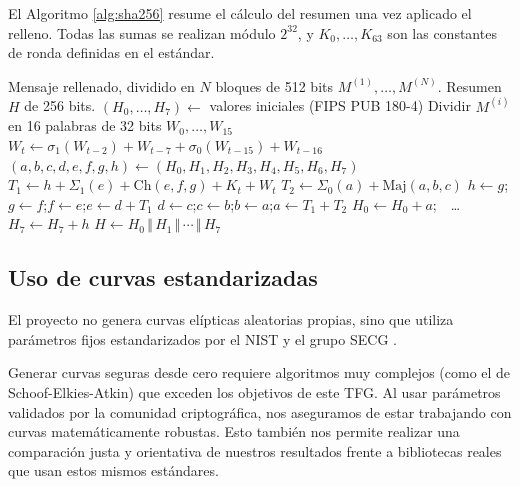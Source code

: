 El Algoritmo \ref{alg:sha256} resume el cálculo del resumen una vez aplicado el relleno. Todas las sumas se realizan módulo \(2^{32}\), y \(K_0,\dots,K_{63}\) son las constantes de ronda definidas en el estándar.

\begin{algorithm}
\caption{Cálculo del resumen SHA-256 (FIPS PUB 180-4)}
\label{alg:sha256}
\begin{algorithmic}[1]
\Require Mensaje rellenado, dividido en \(N\) bloques de 512 bits \(M^{(1)},\dots,M^{(N)}\).
\Ensure Resumen \(H\) de 256 bits.
\State \((H_0,\dots,H_7) \gets\) valores iniciales (FIPS PUB 180-4)
  \State Dividir \(M^{(i)}\) en 16 palabras de 32 bits \(W_0,\dots,W_{15}\)
    \State \(W_t \gets \sigma_1(W_{t-2}) + W_{t-7} + \sigma_0(W_{t-15}) + W_{t-16}\)
  \EndFor
  \State \((a,b,c,d,e,f,g,h) \gets (H_0,H_1,H_2,H_3,H_4,H_5,H_6,H_7)\)
    \State \(T_1 \gets h + \Sigma_1(e) + \mathrm{Ch}(e,f,g) + K_t + W_t\)
    \State \(T_2 \gets \Sigma_0(a) + \mathrm{Maj}(a,b,c)\)
    \State \(h \gets g\);\quad \(g \gets f\);\quad \(f \gets e\);\quad \(e \gets d + T_1\)
    \State \(d \gets c\);\quad \(c \gets b\);\quad \(b \gets a\);\quad \(a \gets T_1 + T_2\)
  \EndFor
  \State \(H_0 \gets H_0 + a\);\ \ \dots\ \ \(H_7 \gets H_7 + h\)
\EndFor
\State \Return \(H \gets H_0 \,\Vert\, H_1 \,\Vert\, \cdots \,\Vert\, H_7\)
\end{algorithmic}
\end{algorithm}

\subsection{Uso de curvas estandarizadas}
\label{subsec:impl-curvas-estandar}

El proyecto no genera curvas elípticas aleatorias propias, sino que utiliza parámetros fijos estandarizados por el NIST \cite{nist-fips186-4} y el grupo SECG \cite{sec2-v2}. 

Generar curvas seguras desde cero requiere algoritmos muy complejos (como el de Schoof-Elkies-Atkin) que exceden los objetivos de este TFG. Al usar parámetros validados por la comunidad 
criptográfica, nos aseguramos de estar trabajando con curvas matemáticamente robustas. Esto también nos permite realizar una comparación justa y orientativa de nuestros resultados frente a 
bibliotecas reales que usan estos mismos estándares.

